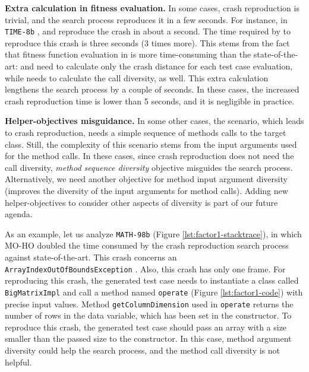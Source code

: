 \textbf{Extra calculation in fitness evaluation. }
In some cases, crash reproduction is trivial, and the search process reproduces it in a few seconds. For instance, in \texttt{TIME-8b} \cite{just2014defects4j}, \SGGA and \decomposition reproduce the crash in about a second. The time required by \moho to reproduce this crash is three seconds (3 times more). This stems from the fact that fitness function evaluation in \moho is more time-consuming than the state-of-the-art: \SGGA and \decomposition need to calculate only the crash distance for each test case evaluation, while \moho needs to calculate the call diversity, as well. This extra calculation lengthens the search process by a couple of seconds. In these cases, the increased crash reproduction time is lower than 5 seconds, and it is negligible in practice.

\textbf{Helper-objectives misguidance. }
In some other cases, the scenario, which leads to crash reproduction, needs a simple sequence of methods calls to the target class. Still, the complexity of this scenario stems from the input arguments used for the method calls. In these cases, since crash reproduction does not need the call diversity, \textit{method sequence diversity} objective misguides the search process. Alternatively, we need another objective for method input argument diversity (\ie improves the diversity of the input arguments for method calls). Adding new helper-objectives to consider other aspects of diversity is part of our future agenda. 

As an example, let us analyze \texttt{MATH-98b} (Figure \ref{lst:factor1-stacktrace}), in which MO-HO doubled the time consumed by the crash reproduction search process against state-of-the-art. This crash concerns an \texttt{ArrayIndexOutOfBounds\-Exception} .
Also, this crash has only one frame. For reproducing this crash, the generated test case needs to instantiate a class called \texttt{BigMatrixImpl} and call a method named \texttt{operate} (Figure \ref{lst:factor1-code}) with precise input values. Method \texttt{getColumnDimension} used in \texttt{operate} returns the number of rows in the data variable, which has been set in the constructor. To reproduce this crash, the generated test case should pass an array with a size smaller than the passed size to the constructor. In this case, method argument diversity could help the search process, and the method call diversity is not helpful.